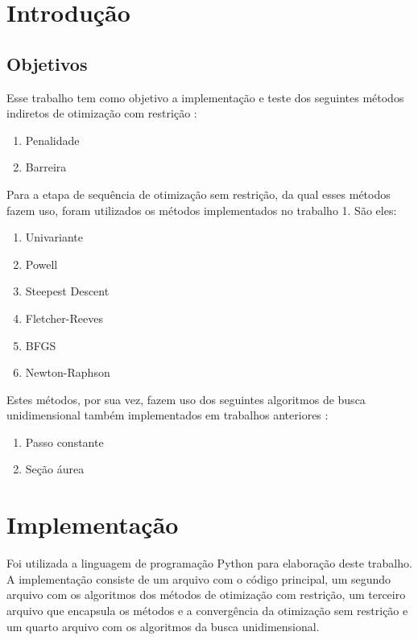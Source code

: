 \documentclass[10pt, a4paper]{article}
\begin{document}
\section{Introdução}

\subsection{Objetivos}

Esse trabalho tem como objetivo a implementação e teste dos seguintes métodos indiretos de otimização com restrição :

\begin{enumerate}
  \item Penalidade
  \item Barreira
\end{enumerate}

Para a etapa de sequência de otimização sem restrição, da qual esses métodos fazem uso, foram utilizados os métodos
implementados no trabalho 1. São eles:

\begin{enumerate}
  \item Univariante
  \item Powell
  \item Steepest Descent
  \item Fletcher-Reeves
  \item BFGS
  \item Newton-Raphson
\end{enumerate}

Estes métodos, por sua vez, fazem uso dos seguintes algoritmos de busca unidimensional também implementados em trabalhos anteriores :

\begin{enumerate}
  \item Passo constante
  \item Seção áurea
\end{enumerate}

\section{Implementação}

Foi utilizada a linguagem de programação Python para elaboração deste trabalho.
A implementação consiste de um arquivo com o código principal, um segundo arquivo com os algoritmos dos métodos de otimização com restrição,
um terceiro arquivo que encapsula os métodos e a convergência da otimização sem restrição
e um quarto arquivo com os algoritmos da busca unidimensional.
\end{document}
